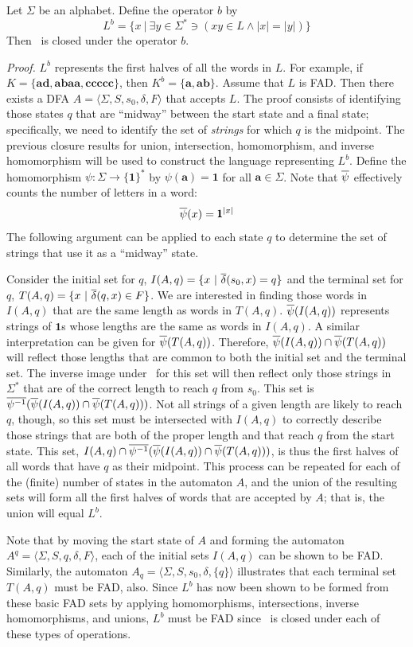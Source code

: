 \begin{thm}\label{thm-5.11}
Let $\Sigma$ be an alphabet. Define the operator $b$ by
\[ L^b=\{x\ |\ \exists y \in \Sigma^* \ni (xy \in L \wedge |x| = |y|)\} \]
Then \DSIG\ is closed under the operator $b$.

\emph{Proof.} $L^b$ represents the first halves of all the words in $L$. For
example, if $K=\{\pmb{ad},\pmb{abaa},\pmb{ccccc}\}$, then
$K^b=\{\pmb{a},\pmb{ab}\}$. Assume that $L$ is FAD. Then there exists a DFA
$A=\langle\Sigma,S,s_0,\delta,F\rangle$ that accepts $L$. The proof consists of
identifying those states $q$ that are ``midway'' between the start state and a
final state; specifically, we need to identify the set of \emph{strings} for
which $q$ is the midpoint. The previous closure results for union, intersection,
homomorphism, and inverse homomorphism will be used to construct the language
representing $L^b$. Define the \emph{} homomorphism
$\psi$$: \Sigma\rightarrow\{\pmb{1}\}^*$ by $\psi(\pmb{a})=\pmb{1}$ for all
$\pmb{a} \in \Sigma$. Note that $\overline{\psi}$ effectively counts the number of letters in a
word:
\[ \overline{\psi}(x) = \pmb{1}^{|x|} \]
The following argument can be applied to each state $q$ to determine the set of
strings that use it as a ``midway'' state.

Consider the initial set for $q$, $I(A,q)=\{x\ |\ \overline{\delta}(s_0,x)=q\}$ and the
terminal set for $q$, $T(A,q)=\{x\ |\ \overline{\delta}(q,x) \in F\}$. We are interested in
finding those words in $I(A,q)$ that are the same length as words in $T(A,q)$.
$\overline{\psi}(I(A,q))$ represents strings of $\pmb{1}$s whose lengths are the same as
words in $I(A,q)$. A similar interpretation can be given for $\overline{\psi}(T(A,q))$.
Therefore, $\overline{\psi}(I(A,q)) \cap \overline{\psi}(T(A,q))$ will reflect those lengths that
are common to both the initial set and the terminal set. The inverse image under
\PBAR\ for this set will then reflect only those strings in $\Sigma^*$ that are
of the correct length to reach $q$ from $s_0$. This set is
$\overline{\psi^{-1}}(\overline{\psi}(I(A,q)) \cap \overline{\psi}(T(A,q)))$. Not all strings of a given
length are likely to reach $q$, though, so this set must be intersected with
$I(A,q)$ to correctly describe those strings that are both of the proper length
and that reach $q$ from the start state. This set,
$I(A,q) \cap \overline{\psi^{-1}}(\overline{\psi}(I(A,q)) \cap \overline{\psi}(T(A,q)))$, is thus the first
halves of all words that have $q$ as their midpoint. This process can be
repeated for each of the (finite) number of states in the automaton $A$, and the
union of the resulting sets will form all the first halves of words that are
accepted by $A$; that is, the union will equal $L^b$.

Note that by moving the start state of $A$ and forming the automaton
$A^q=\langle\Sigma,S,q,\delta,F\rangle$, each of the initial sets $I(A,q)$ can
be shown to be FAD. Similarly, the automaton
$A_q=\langle\Sigma,S,s_0,\delta,\{q\}\rangle$ illustrates that each terminal set
$T(A,q)$ must be FAD, also. Since $L^b$ has now been shown to be formed from
these basic FAD sets by applying homomorphisms, intersections, inverse
homomorphisms, and unions, $L^b$ must be FAD since \DSIG\ is closed under each
of these types of operations.
\end{thm}

